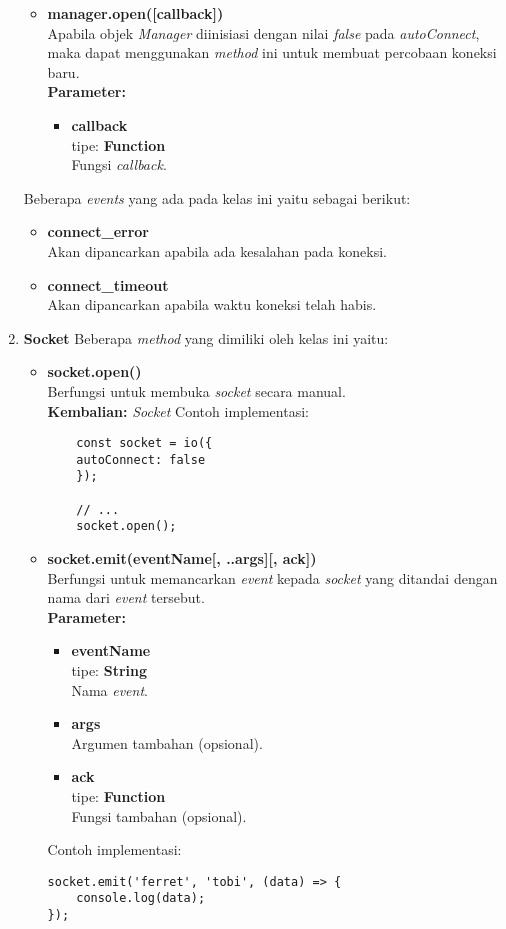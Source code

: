\begin{enumerate}
\begin{itemize}
		\item \textbf{manager.open([callback])} \\
		Apabila objek \textit{Manager} diinisiasi dengan nilai \textit{false} pada \textit{autoConnect}, maka dapat menggunakan \textit{method} ini untuk membuat percobaan koneksi baru.\\
		\textbf{Parameter:}
		\begin{itemize}
			\item \textbf{callback} \\tipe: \textbf{Function} \\ Fungsi \textit{callback}.
		\end{itemize}
	\end{itemize}

	Beberapa \textit{events} yang ada pada kelas ini yaitu sebagai berikut:
	\begin{itemize}
		\item \textbf{connect\_error} \\ Akan dipancarkan apabila ada kesalahan pada koneksi.
		\item \textbf{connect\_timeout} \\ Akan dipancarkan apabila waktu koneksi telah habis.
	\end{itemize}
	
	\item \textbf{Socket}
	Beberapa \textit{method} yang dimiliki oleh kelas ini yaitu:
	\begin{itemize}
		\item \textbf{socket.open()} \\ Berfungsi untuk membuka \textit{socket} secara manual.\\
		\textbf{Kembalian:} \textit{Socket}
		Contoh implementasi:
	\begin{lstlisting}
	const socket = io({
	autoConnect: false
	});
	
	// ...
	socket.open();
	\end{lstlisting}
	
	\item \textbf{socket.emit(eventName[, ..args][, ack])} \\ 
	Berfungsi untuk memancarkan \textit{event} kepada \textit{socket} yang ditandai dengan nama dari \textit{event} tersebut.\\ 
	\textbf{Parameter:}
	\begin{itemize}
		\item \textbf{eventName} \\tipe: \textbf{String} \\ Nama \textit{event}.
		\item \textbf{args} \\ Argumen tambahan (opsional).
		\item \textbf{ack} \\tipe: \textbf{Function} \\ Fungsi tambahan (opsional).
	\end{itemize}
	Contoh implementasi:
\begin{lstlisting}
socket.emit('ferret', 'tobi', (data) => {
	console.log(data);
});
\end{lstlisting}
	

\end{itemize}
\end{enumerate}
